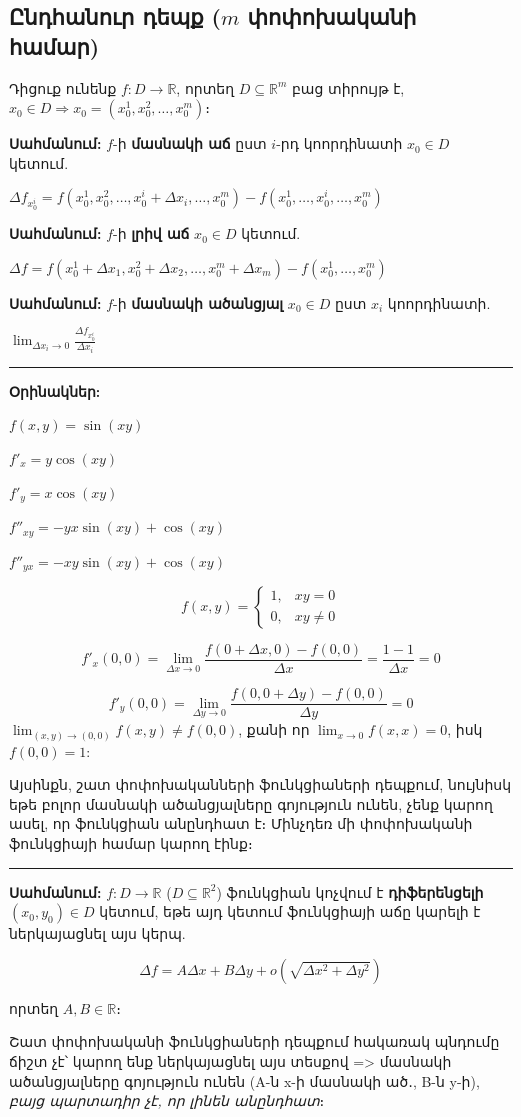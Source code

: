 \documentclass[12pt, a4paper]{article}
\begin{document}
\subsection{Ընդհանուր դեպք ($m$ փոփոխականի համար)}
Դիցուք ունենք $f: D \to \mathbb{R}$, որտեղ $D \subseteq \mathbb{R}^m$ բաց տիրույթ է, $x_0 \in D \Rightarrow x_0 = (x_0^1, x_0^2, \dots, x_0^m)$։

\textbf{Սահմանում:} $f$-ի \textbf{մասնակի աճ} ըստ $i$-րդ կոորդինատի $x_0 \in D$ կետում.

$\Delta f_{x_0^i} = f(x_0^1, x_0^2, \dots, x_0^i + \Delta x_i, \dots, x_0^m) - f(x_0^1, \dots, x_0^i, \dots, x_0^m)$

\textbf{Սահմանում:} $f$-ի \textbf{լրիվ աճ} $x_0 \in D$ կետում.

$\Delta f = f(x_0^1 + \Delta x_1, x_0^2 + \Delta x_2, \dots, x_0^m + \Delta x_m) - f(x_0^1, \dots, x_0^m)$

\textbf{Սահմանում:} $f$-ի \textbf{մասնակի ածանցյալ} $x_0 \in D$ ըստ $x_i$ կոորդինատի.

$\lim_{\Delta x_i \to 0} \frac{\Delta f_{x_0^i}}{\Delta x_i}$

\vspace{1em}
\hrule
\vspace{1em}

\textbf{Օրինակներ:}

$f(x, y) = \sin(xy)$

$f'_x = y \cos(xy)$

$f'_y = x \cos(xy)$

$f''_{xy} = -yx \sin(xy) + \cos(xy)$

$f''_{yx} = -xy \sin(xy) + \cos(xy)$

$$
f(x, y) = \begin{cases} 1, & xy=0 \\ 0, & xy \neq 0 \end{cases}
$$

$$
f'_x(0,0) = \lim_{\Delta x \to 0} \frac{f(0 + \Delta x, 0) - f(0, 0)}{\Delta x} = \frac{1-1}{\Delta x} = 0
$$

$$
f'_y(0,0) = \lim_{\Delta y \to 0} \frac{f(0, 0 + \Delta y) - f(0, 0)}{\Delta y} = 0
$$
$\lim_{(x,y) \to (0,0)} f(x, y) \neq f(0, 0)$, քանի որ $\lim_{x \to 0} f(x, x) = 0$, իսկ $f(0, 0) = 1$:

Այսինքն, շատ փոփոխականների ֆունկցիաների դեպքում, նույնիսկ եթե բոլոր մասնակի ածանցյալները գոյություն ունեն, չենք կարող ասել, որ ֆունկցիան անընդհատ է։ Մինչդեռ մի փոփոխականի ֆունկցիայի համար կարող էինք։

\vspace{1em}
\hrule
\vspace{1em}

\textbf{Սահմանում:} $f: D \to \mathbb{R}$ ($D \subseteq \mathbb{R}^2$) ֆունկցիան կոչվում է \textbf{դիֆերենցելի} $(x_0, y_0) \in D$ կետում, եթե այդ կետում ֆունկցիայի աճը կարելի է ներկայացնել այս կերպ.

$$\Delta f = A\Delta x + B\Delta y + o(\sqrt{\Delta x^2 + \Delta y^2})$$

որտեղ $A, B \in \mathbb{R}$։

Շատ փոփոխականի ֆունկցիաների դեպքում հակառակ պնդումը ճիշտ չէ՝ կարող ենք ներկայացնել այս տեսքով => մասնակի ածանցյալները գոյություն ունեն (A-ն x-ի մասնակի ած․, B-ն y-ի), \textit{բայց պարտադիր չէ, որ լինեն անընդհատ}։
\end{document}
